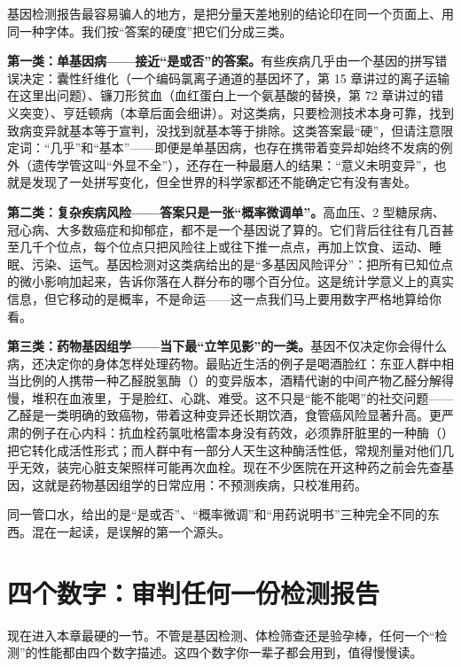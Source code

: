 基因检测报告最容易骗人的地方，是把分量天差地别的结论印在同一个页面上、用同一种字体。我们按“答案的硬度”把它们分成三类。

\textbf{第一类：单基因病——接近“是或否”的答案。}有些疾病几乎由一个基因的拼写错误决定：囊性纤维化（一个编码氯离子通道的基因坏了，第 15 章讲过的离子运输在这里出问题）、镰刀形贫血（血红蛋白上一个氨基酸的替换，第 72 章讲过的错义突变）、亨廷顿病（本章后面会细讲）。对这类病，只要检测技术本身可靠，找到致病变异就基本等于宣判，没找到就基本等于排除。这类答案最“硬”，但请注意限定词：“几乎”和“基本”——即便是单基因病，也存在携带着变异却始终不发病的例外（遗传学管这叫“外显不全”），还存在一种最磨人的结果：“意义未明变异”，也就是发现了一处拼写变化，但全世界的科学家都还不能确定它有没有害处。

\textbf{第二类：复杂疾病风险——答案只是一张“概率微调单”。}高血压、2 型糖尿病、冠心病、大多数癌症和抑郁症，都不是一个基因说了算的。它们背后往往有几百甚至几千个位点，每个位点只把风险往上或往下推一点点，再加上饮食、运动、睡眠、污染、运气。基因检测对这类病给出的是“多基因风险评分”：把所有已知位点的微小影响加起来，告诉你落在人群分布的哪个百分位。这是统计学意义上的真实信息，但它移动的是概率，不是命运——这一点我们马上要用数字严格地算给你看。

\textbf{第三类：药物基因组学——当下最“立竿见影”的一类。}基因不仅决定你会得什么病，还决定你的身体怎样处理药物。最贴近生活的例子是喝酒脸红：东亚人群中相当比例的人携带一种乙醛脱氢酶（）的变异版本，酒精代谢的中间产物乙醛分解得慢，堆积在血液里，于是脸红、心跳、难受。这不只是“能不能喝”的社交问题——乙醛是一类明确的致癌物，带着这种变异还长期饮酒，食管癌风险显著升高。更严肃的例子在心内科：抗血栓药氯吡格雷本身没有药效，必须靠肝脏里的一种酶（）把它转化成活性形式；而人群中有一部分人天生这种酶活性低，常规剂量对他们几乎无效，装完心脏支架照样可能再次血栓。现在不少医院在开这种药之前会先查基因，这就是药物基因组学的日常应用：不预测疾病，只校准用药。

同一管口水，给出的是“是或否”、“概率微调”和“用药说明书”三种完全不同的东西。混在一起读，是误解的第一个源头。

\section{四个数字：审判任何一份检测报告}

现在进入本章最硬的一节。不管是基因检测、体检筛查还是验孕棒，任何一个“检测”的性能都由四个数字描述。这四个数字你一辈子都会用到，值得慢慢读。

